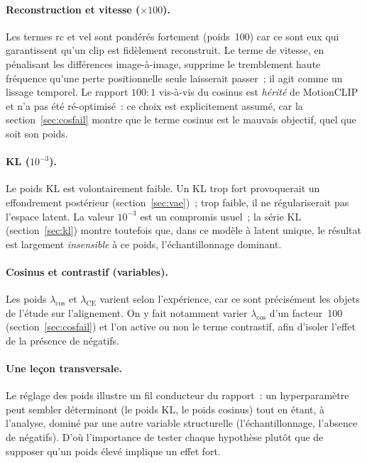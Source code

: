 \documentclass[12pt,a4paper,oneside]{report}
\theoremstyle{definition}
\theoremstyle{plain}
\newcommand{\rc}{\mathrm{rc}}
\newcommand{\vel}{\mathrm{vel}}
\begin{document}
\paragraph{Reconstruction et vitesse ($\times100$).} Les termes $\rc$ et $\vel$ sont
pondérés fortement (poids~100) car ce sont eux qui garantissent qu'un clip est
fidèlement reconstruit. Le terme de vitesse, en pénalisant les différences
image-à-image, supprime le tremblement haute fréquence qu'une perte positionnelle
seule laisserait passer~; il agit comme un lissage temporel. Le rapport $100{:}1$
vis-à-vis du cosinus est \emph{hérité} de MotionCLIP et n'a pas été ré-optimisé~:
ce choix est explicitement assumé, car la section~\ref{sec:cosfail} montre que le
terme cosinus est le mauvais objectif, quel que soit son poids.

\paragraph{KL ($10^{-3}$).} Le poids KL est volontairement faible. Un KL trop fort
provoquerait un effondrement postérieur (section~\ref{sec:vae})~; trop faible, il ne
régulariserait pas l'espace latent. La valeur $10^{-3}$ est un compromis usuel~; la
série KL (section~\ref{sec:kl}) montre toutefois que, dans ce modèle à latent unique,
le résultat est largement \emph{insensible} à ce poids, l'échantillonnage dominant.

\paragraph{Cosinus et contrastif (variables).} Les poids $\lambda_{\cos}$ et
$\lambda_{\mathrm{CE}}$ varient selon l'expérience, car ce sont précisément les
objets de l'étude sur l'alignement. On y fait notamment varier $\lambda_{\cos}$ d'un
facteur~100 (section~\ref{sec:cosfail}) et l'on active ou non le terme contrastif,
afin d'isoler l'effet de la présence de négatifs.

\paragraph{Une leçon transversale.} Le réglage des poids illustre un fil conducteur
du rapport~: un hyperparamètre peut sembler déterminant (le poids KL, le poids
cosinus) tout en étant, à l'analyse, dominé par une autre variable structurelle
(l'échantillonnage, l'absence de négatifs). D'où l'importance de tester chaque
hypothèse plutôt que de supposer qu'un poids élevé implique un effet fort.
\end{document}
